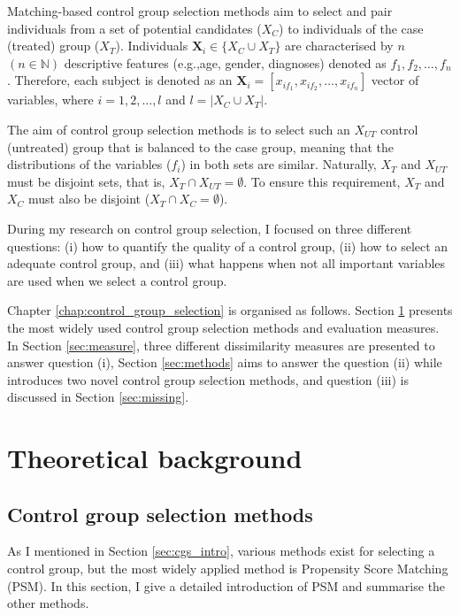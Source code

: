 Matching-based control group selection methods aim to select and pair individuals from a set of potential candidates ($X_C$) to individuals of the case (treated) group ($X_T$). Individuals $\textbf{X}_i \in \{X_C \cup X_T\}$ are characterised by $n$ $(n \in \mathbb{N})$ descriptive features (e.g.,age, gender, diagnoses) denoted as $f_1, f_2, \dots, f_n$. Therefore, each subject is denoted as an $\textbf{X}_i =[x_{if_1}, x_{if_2}, \dots, x_{if_n}]$ vector of variables, where $i=1, 2, \dots,l$ and $l=|X_C \cup X_T|$.

The aim of control group selection methods is to select such an $X_{UT}$ control (untreated) group that is balanced to the case group, meaning that the distributions of the variables ($f_i$) in both sets are similar. Naturally, $X_T$ and $X_{UT}$ must be disjoint sets, that is, $X_T \cap X_{UT} = \emptyset$. To ensure this requirement, $X_T$ and $X_C$ must also be disjoint ($X_T \cap X_C = \emptyset$).

During my research on control group selection, I focused on three different questions: (i) how to quantify the quality of a control group, (ii) how to select an adequate control group, and (iii) what happens when not all important variables are used when we select a control group.

Chapter \ref{chap:control_group_selection} is organised as follows. Section \ref{sec:theo_selection} presents the most widely used control group selection methods and evaluation measures. In Section \ref{sec:measure}, three different dissimilarity measures are presented to answer question (i), Section \ref{sec:methods} aims to answer the question (ii) while introduces two novel control group selection methods, and question (iii) is discussed in Section \ref{sec:missing}.

\section{Theoretical background}
\label{sec:theo_selection}

\subsection{Control group selection methods}
\label{sec:cgsm}

As I mentioned in Section \ref{sec:cgs_intro}, various methods exist for selecting a control group, but the most widely applied method is Propensity Score Matching (PSM). In this section, I give a detailed introduction of PSM and summarise the other methods. 

